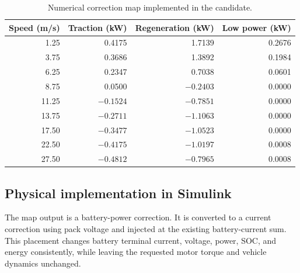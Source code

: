 \documentclass[11pt,letterpaper]{article}
\begin{document}
\begin{table}[H]
\centering
\caption{Numerical correction map implemented in the candidate.}
\small
\begin{tabular}{rrrr}
\toprule
Speed (m/s) & Traction (kW) & Regeneration (kW) & Low power (kW) \\
\midrule
1.25  &  0.4175 &  1.7139 & 0.2676 \\
3.75  &  0.3686 &  1.3892 & 0.1984 \\
6.25  &  0.2347 &  0.7038 & 0.0601 \\
8.75  &  0.0500 & $-0.2403$ & 0.0000 \\
11.25 & $-0.1524$ & $-0.7851$ & 0.0000 \\
13.75 & $-0.2711$ & $-1.1063$ & 0.0000 \\
17.50 & $-0.3477$ & $-1.0523$ & 0.0000 \\
22.50 & $-0.4175$ & $-1.0197$ & 0.0008 \\
27.50 & $-0.4812$ & $-0.7965$ & 0.0008 \\
\bottomrule
\end{tabular}
\end{table}

\subsection{Physical implementation in Simulink}

The map output is a battery-power correction. It is converted to a current
correction using pack voltage and injected at the existing battery-current sum.
This placement changes battery terminal current, voltage, power, SOC, and energy
consistently, while leaving the requested motor torque and vehicle dynamics
unchanged.
\end{document}
